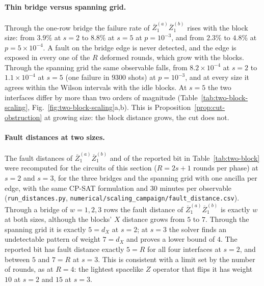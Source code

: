 \documentclass[aps,prx,reprint,superscriptaddress,nofootinbib,floatfix,longbibliography]{revtex4-2}
\theoremstyle{definition}
\begin{document}
\paragraph{Thin bridge versus spanning grid.}
Through the one-row bridge the failure rate of
$\overline Z_1^{(a)}\overline Z_1^{(b)}$ rises with the block size: from
$3.9\%$ at $s=2$ to $8.8\%$ at $s=5$ at $p=10^{-3}$, and from $2.3\%$ to
$4.8\%$ at $p=5\times10^{-4}$.  A fault on the bridge edge is never detected,
and the edge is exposed in every one of the $R$ deformed rounds, which grow
with the blocks.  Through the spanning grid the same observable falls, from
$8.2\times10^{-4}$ at $s=2$ to $1.1\times10^{-4}$ at $s=5$ (one failure in
$9300$ shots) at $p=10^{-3}$, and at every size it agrees within the Wilson
intervals with the idle blocks.  At $s=5$ the two interfaces differ by more
than two orders of magnitude (Table~\ref{tab:two-block-scaling},
Fig.~\ref{fig:two-block-scaling}a,b).  This is
Proposition~\ref{prop:cut-obstruction} at growing size: the block distance
grows, the cut does not.

\paragraph{Fault distances at two sizes.}
The fault distances of $\overline Z_1^{(a)}\overline Z_1^{(b)}$ and of the
reported bit in Table~\ref{tab:two-block} were recomputed for the circuits of
this section ($R=2s+1$ rounds per phase) at $s=2$ and $s=3$, for the three
bridges and the spanning grid with one ancilla per edge, with the same CP-SAT
formulation and $30$ minutes per observable
(\texttt{run\_distances.py},
\nolinkurl{numerical/scaling_campaign/fault_distance.csv}).  Through a bridge
of $w=1,2,3$ rows the fault distance of
$\overline Z_1^{(a)}\overline Z_1^{(b)}$ is exactly $w$ at both sizes, although
the blocks' $X$ distance grows from $5$ to $7$.  Through the spanning grid it
is exactly $5=d_X$ at $s=2$; at $s=3$ the solver finds an undetectable
pattern of weight $7=d_X$ and proves a lower bound of $4$.  The reported bit
has fault distance exactly $5=R$ for all four interfaces at $s=2$, and between
$5$ and $7=R$ at $s=3$.  This is consistent with a limit set by the number of
rounds, as at $R=4$: the lightest spacelike $Z$ operator that flips it has
weight $10$ at $s=2$ and $15$ at $s=3$.
\end{document}
